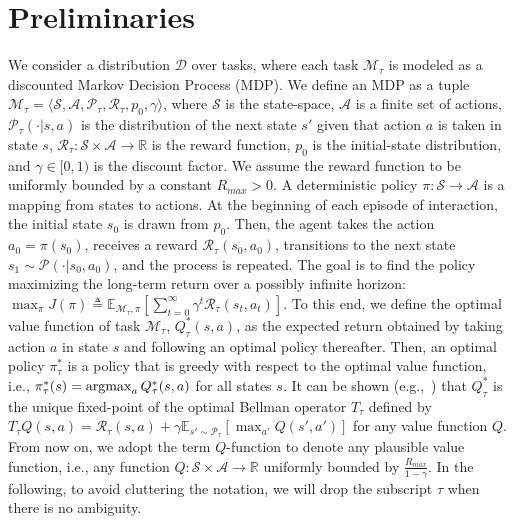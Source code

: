 \documentclass{article}
\newcommand{\argmax}{\operatornamewithlimits{argmax}}
\begin{document}
\section{Preliminaries}

We consider a distribution $\mathcal{D}$ over tasks, where each task $\mathcal{M}_\tau$ is modeled as a discounted Markov Decision Process (MDP). We define an MDP as a tuple $\mathcal{M}_\tau = \langle \mathcal{S},\mathcal{A},\mathcal{P}_\tau,\mathcal{R}_\tau,p_0,\gamma\rangle$, where $\mathcal{S}$ is the state-space, $\mathcal{A}$ is a finite set of actions, $\mathcal{P}_\tau(\cdot | s,a)$ is the distribution of the next state $s'$ given that action $a$ is taken in state $s$, $\mathcal{R}_\tau: \mathcal{S}\times\mathcal{A}\rightarrow\mathbb{R}$ is the reward function, $p_0$ is the initial-state distribution, and $\gamma\in [0,1)$ is the discount factor. We assume the reward function to be uniformly bounded by a constant $R_{max}>0$. A deterministic policy $\pi : \mathcal{S} \rightarrow \mathcal{A}$ is a mapping from states to actions. At the beginning of each episode of interaction, the initial state $s_0$ is drawn from $p_0$. Then, the agent takes the action $a_0 = \pi(s_0)$, receives a reward $\mathcal{R}_\tau(s_0,a_0)$, transitions to the next state $s_1 \sim \mathcal{P}(\cdot | s_0,a_0)$, and the process is repeated. The goal is to find the policy maximizing the long-term return over a possibly infinite horizon: $\max_{\pi}J(\pi)\triangleq\mathbb{E}_{\mathcal{M}_\tau,\pi}[\sum_{t=0}^{\infty} \gamma^t \mathcal{R}_\tau(s_t,a_t)]$. To this end, we define the optimal value function of task $\mathcal{M}_\tau$, $Q_\tau^*(s,a)$, as the expected return obtained by taking action $a$ in state $s$ and following an optimal policy thereafter. Then, an optimal policy $\pi_\tau^*$ is a policy that is greedy with respect to the optimal value function, i.e., $\pi_\tau^*(s) = \argmax_a Q_\tau^*(s,a)$ for all states $s$. It can be shown (e.g.,~\cite{puterman1994markov}) that $Q_\tau^*$ is the unique fixed-point of the optimal Bellman operator $T_\tau$ defined by $T_\tau Q(s,a) = \mathcal{R}_\tau(s,a) + \gamma\mathbb{E}_{s' \sim\mathcal{P}_\tau}[\max_{a'}Q(s',a')]$ for any value function $Q$. From now on, we adopt the term $Q$-function to denote any plausible value function, i.e., any function $Q : \mathcal{S}\times\mathcal{A} \rightarrow \mathbb{R}$ uniformly bounded by $\frac{R_{max}}{1-\gamma}$. In the following, to avoid cluttering the notation, we will drop the subscript $\tau$ when there is no ambiguity.
\end{document}
